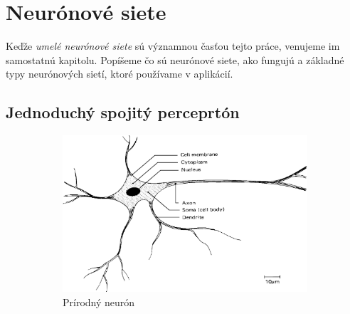 
\chapter{Neurónové siete}\label{chap:neuralnet}

Keďže \textit{umelé neurónové siete} sú významnou časťou tejto práce, venujeme im samostatnú kapitolu. Popíšeme čo sú neurónové siete, ako fungujú a základné typy neurónových sietí, ktoré používame v aplikácií.
\bigskip

\section{Jednoduchý spojitý perceprtón}

\begin{figure}[hp]
  \begin{center}
    \begin{subfigure}[b]{0.6\textwidth}
      \centering
      \includegraphics[width=\textwidth]{images/bio_neuron}
      \caption{Prírodný neurón}
      \label{fig:bio_neuron}
    \end{subfigure}
    \begin{subfigure}[b]{0.3\textwidth}
      \centering

\end{subfigure}
\end{center}
\end{figure}
